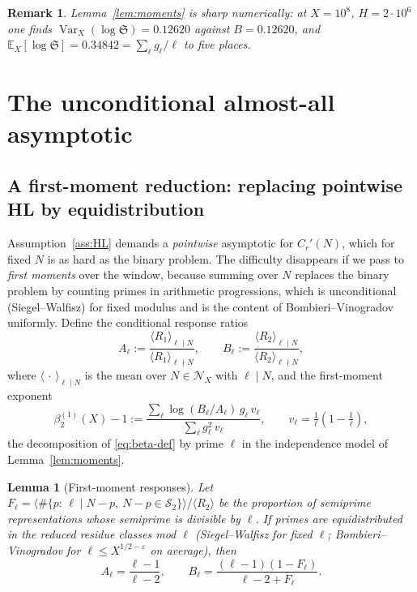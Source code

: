 \documentclass[]{interact}%
\newtheorem{remark}{Remark}
\newtheorem{lemma}{Lemma}
\newcommand{\SSemi}{\mathcal S_2}
\newcommand{\sing}{\mathfrak S}
\newcommand{\Var}{\operatorname{Var}}
\begin{document}
\begin{remark}
Lemma~\ref{lem:moments} is sharp numerically: at $X=10^{8}$, $H=2\cdot10^{6}$ one
finds $\Var_X(\log\sing)=0.12620$ against $B=0.12620$, and
$\mathbb E_X[\log\sing]=0.34842=\sum_\ell g_\ell/\ell$ to five places.
\end{remark}

\section{The unconditional almost-all asymptotic}
\label{app:uncond}

\subsection{A first-moment reduction: replacing pointwise HL by equidistribution}
\label{sec:firstmoment}

Assumption~\ref{ass:HL} demands a \emph{pointwise} asymptotic for $C_r'(N)$, which for
fixed $N$ is as hard as the binary problem. The difficulty disappears if we pass to
\emph{first moments} over the window, because summing over $N$ replaces the binary
problem by counting primes in arithmetic progressions, which is unconditional
(Siegel--Walfisz) for fixed modulus and is the content of Bombieri--Vinogradov
uniformly. Define the conditional response ratios
\[
  A_\ell:=\frac{\langle R_1\rangle_{\ell\mid N}}{\langle R_1\rangle_{\ell\nmid N}},
  \qquad
  B_\ell:=\frac{\langle R_2\rangle_{\ell\mid N}}{\langle R_2\rangle_{\ell\nmid N}},
\]
where $\langle\,\cdot\,\rangle_{\ell\mid N}$ is the mean over $N\in\mathcal N_X$ with
$\ell\mid N$, and the first-moment exponent
\begin{equation}
  \beta_2^{(1)}(X)-1:=\frac{\sum_\ell\log(B_\ell/A_\ell)\,g_\ell\,v_\ell}
                          {\sum_\ell g_\ell^2\,v_\ell},\qquad v_\ell=\tfrac1\ell(1-\tfrac1\ell),
  \label{eq:beta-fm}
\end{equation}
the decomposition of \eqref{eq:beta-def} by prime $\ell$ in the independence model of
Lemma~\ref{lem:moments}.

\begin{lemma}[First-moment responses]\label{lem:fm}
Let $F_\ell=\langle\#\{p:\,\ell\mid N-p,\ N-p\in\SSemi\}\rangle/\langle R_2\rangle$ be
the proportion of semiprime representations whose semiprime is divisible by $\ell$.
If primes are equidistributed in the reduced residue classes mod $\ell$ (Siegel--Walfisz
for fixed $\ell$; Bombieri--Vinogradov for $\ell\le X^{1/2-\varepsilon}$ on average),
then
\[
  A_\ell=\frac{\ell-1}{\ell-2},\qquad
  B_\ell=\frac{(\ell-1)(1-F_\ell)}{\ell-2+F_\ell}.
\]
\end{lemma}
\end{document}
